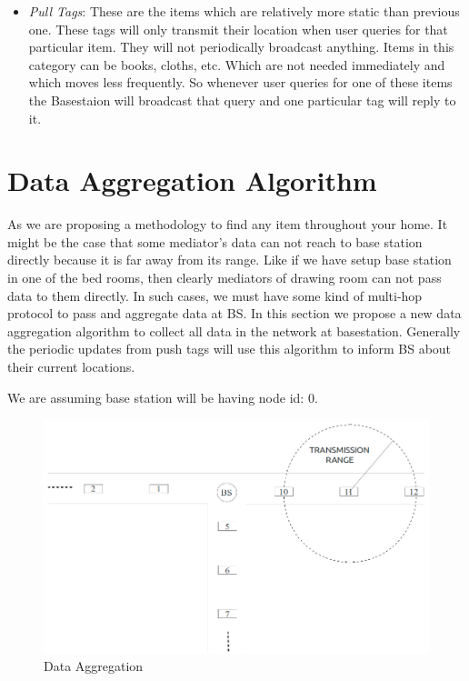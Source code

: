 \documentclass [a4paper,12pt]{book}
\begin{document}
\begin{itemize}
\begin{itemize}
\item \emph{Pull Tags}: These are the items which are relatively more static than previous one. These tags will only transmit their location when user queries for that particular item. They will not periodically broadcast anything. Items in this category can be books, cloths, etc. Which are not needed immediately and which moves less frequently. So whenever user queries for one of these items the Basestaion will broadcast that query and one particular tag will reply to it.
\end{itemize}

\end{itemize}

\section{Data Aggregation Algorithm}

As we are proposing a methodology to find any item throughout your home. It might be the case that some mediator's data can not reach to base station directly because it is far away from its range. Like if we have setup base station in one of the bed rooms, then clearly mediators of drawing room can not pass data to them directly. In such cases, we must have some kind of multi-hop protocol to pass and aggregate data at BS. In this section we propose a new data aggregation algorithm to collect all data in the network at basestation. Generally the periodic updates from push tags will use this algorithm to inform BS about their current locations.

We are assuming base station will be having node id: 0.
\begin{figure}[!h]
\begin{center}
\includegraphics[scale=0.47]{images/9.png}
\caption{Data Aggregation}
\label{aggregation}
\end{center}
\end{figure}
\end{document}
